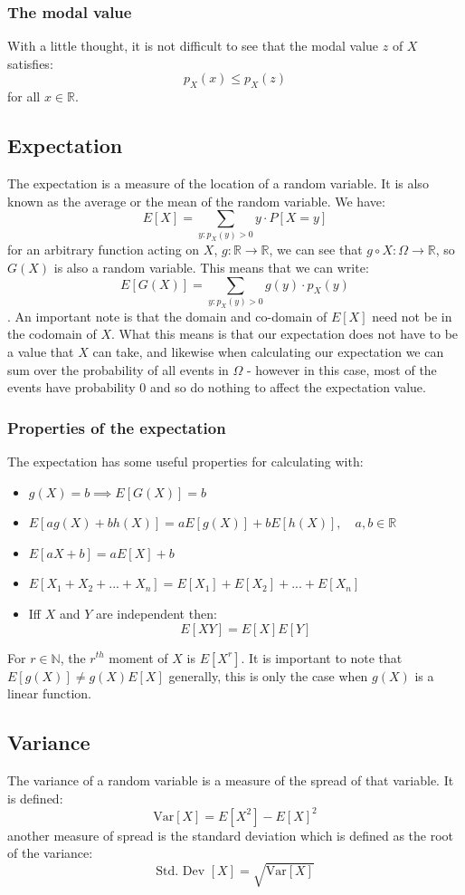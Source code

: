 \documentclass[12pt]{article}
\begin{document}
\subsubsection*{The modal value}
With a little thought, it is not difficult to see that the modal value \(z\) of \(X\) satisfies:
\[p_X(x)\leq p_X(z)\]
for all \(x\in\mathbb{R}\).
\subsection*{Expectation}
The expectation is a measure of the location of a random variable. It is also known as the average or the mean of the random variable. We have:
\[E[X]=\sum_{y:p_X(y)>0}y\cdot P[X=y]\]
for an arbitrary function acting on \(X\), \(g:\mathbb{R}\to\mathbb{R}\), we can see that \(g\circ X:\Omega\to\mathbb{R}\), so \(G(X)\) is also a random variable. This means that we can write:
\[E[G(X)]=\sum_{y:p_X(y)>0}g(y)\cdot p_X(y)\].
An important note is that the domain and co-domain of \(E[X]\) need not be in the codomain of \(X\). What this means is that our expectation does not have to be a value that \(X\) can take, and likewise when calculating our expectation we can sum over the probability of all events in \(\Omega\) - however in this case, most of the events have probability 0 and so do nothing to affect the expectation value.
\subsubsection*{Properties of the expectation}
The expectation has some useful properties for calculating with:
\begin{itemize}
    \item \(g(X)=b \implies E[G(X)]=b\)
    \item \(E[ag(X)+bh(X)]=aE[g(X)]+bE[h(X)],\quad a,b\in\mathbb{R}\)
    \item \(E[aX+b]=aE[X]+b\)
    \item \(E[X_1+X_2+...+X_n]=E[X_1]+E[X_2]+...+E[X_n]\)
    \item Iff \(X\) and \(Y\) are independent then: \[E[XY]=E[X]E[Y]\]
\end{itemize}
For \(r\in\mathbb{N}\), the \(r^{th}\) moment of \(X\) is \(E[X^r]\). It is important to note that \(E[g(X)]\ne g(X)E[X]\) generally, this is only the case when \(g(X)\) is a linear function.
\subsection*{Variance}
The variance of a random variable is a measure of the spread of that variable. It is defined:
\[\text{Var}[X]=E[X^2]-E[X]^2\]
another measure of spread is the standard deviation which is defined as the root of the variance:
\[\text{Std. Dev }[X]=\sqrt{\text{Var}[X]}\]
\end{document}
